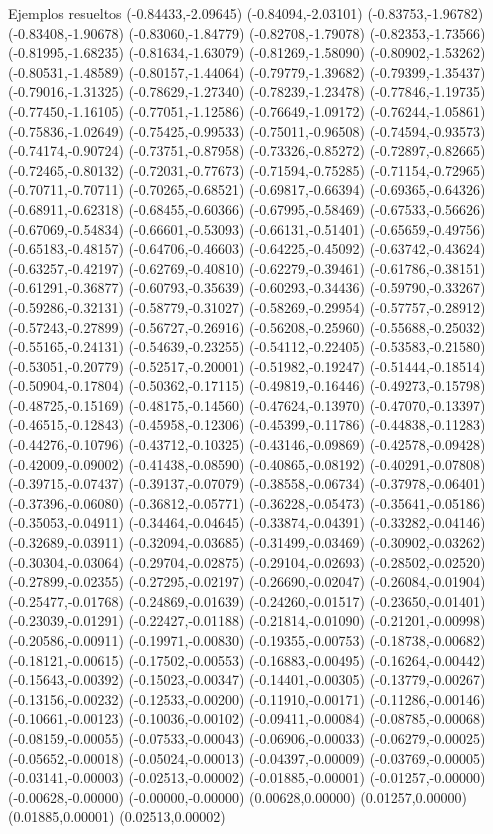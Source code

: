 \documentclass[11pt,a4paper]{article}
\begin{document}
\begin{fmex}{Ejemplos resueltos}
(-0.84433,-2.09645) (-0.84094,-2.03101) (-0.83753,-1.96782) (-0.83408,-1.90678) (-0.83060,-1.84779) (-0.82708,-1.79078) (-0.82353,-1.73566) (-0.81995,-1.68235) (-0.81634,-1.63079) (-0.81269,-1.58090) (-0.80902,-1.53262) (-0.80531,-1.48589) (-0.80157,-1.44064) (-0.79779,-1.39682) (-0.79399,-1.35437) (-0.79016,-1.31325) (-0.78629,-1.27340) (-0.78239,-1.23478) (-0.77846,-1.19735) (-0.77450,-1.16105) (-0.77051,-1.12586) (-0.76649,-1.09172) (-0.76244,-1.05861) (-0.75836,-1.02649) (-0.75425,-0.99533) (-0.75011,-0.96508) (-0.74594,-0.93573) (-0.74174,-0.90724) (-0.73751,-0.87958) (-0.73326,-0.85272) (-0.72897,-0.82665) (-0.72465,-0.80132) (-0.72031,-0.77673) (-0.71594,-0.75285) (-0.71154,-0.72965) (-0.70711,-0.70711) (-0.70265,-0.68521) (-0.69817,-0.66394) (-0.69365,-0.64326) (-0.68911,-0.62318) (-0.68455,-0.60366) (-0.67995,-0.58469) (-0.67533,-0.56626) (-0.67069,-0.54834) (-0.66601,-0.53093) (-0.66131,-0.51401) (-0.65659,-0.49756) (-0.65183,-0.48157) (-0.64706,-0.46603) (-0.64225,-0.45092) (-0.63742,-0.43624) (-0.63257,-0.42197) (-0.62769,-0.40810) (-0.62279,-0.39461) (-0.61786,-0.38151) (-0.61291,-0.36877) (-0.60793,-0.35639) (-0.60293,-0.34436) (-0.59790,-0.33267) (-0.59286,-0.32131) (-0.58779,-0.31027) (-0.58269,-0.29954) (-0.57757,-0.28912) (-0.57243,-0.27899) (-0.56727,-0.26916) (-0.56208,-0.25960) (-0.55688,-0.25032) (-0.55165,-0.24131) (-0.54639,-0.23255) (-0.54112,-0.22405) (-0.53583,-0.21580) (-0.53051,-0.20779) (-0.52517,-0.20001) (-0.51982,-0.19247) (-0.51444,-0.18514) (-0.50904,-0.17804) (-0.50362,-0.17115) (-0.49819,-0.16446) (-0.49273,-0.15798) (-0.48725,-0.15169) (-0.48175,-0.14560) (-0.47624,-0.13970) (-0.47070,-0.13397) (-0.46515,-0.12843) (-0.45958,-0.12306) (-0.45399,-0.11786) (-0.44838,-0.11283) (-0.44276,-0.10796) (-0.43712,-0.10325) (-0.43146,-0.09869) (-0.42578,-0.09428) (-0.42009,-0.09002) (-0.41438,-0.08590) (-0.40865,-0.08192) (-0.40291,-0.07808) (-0.39715,-0.07437) (-0.39137,-0.07079) (-0.38558,-0.06734) (-0.37978,-0.06401) (-0.37396,-0.06080) (-0.36812,-0.05771) (-0.36228,-0.05473) (-0.35641,-0.05186) (-0.35053,-0.04911) (-0.34464,-0.04645) (-0.33874,-0.04391) (-0.33282,-0.04146) (-0.32689,-0.03911) (-0.32094,-0.03685) (-0.31499,-0.03469) (-0.30902,-0.03262) (-0.30304,-0.03064) (-0.29704,-0.02875) (-0.29104,-0.02693) (-0.28502,-0.02520) (-0.27899,-0.02355) (-0.27295,-0.02197) (-0.26690,-0.02047) (-0.26084,-0.01904) (-0.25477,-0.01768) (-0.24869,-0.01639) (-0.24260,-0.01517) (-0.23650,-0.01401) (-0.23039,-0.01291) (-0.22427,-0.01188) (-0.21814,-0.01090) (-0.21201,-0.00998) (-0.20586,-0.00911) (-0.19971,-0.00830) (-0.19355,-0.00753) (-0.18738,-0.00682) (-0.18121,-0.00615) (-0.17502,-0.00553) (-0.16883,-0.00495) (-0.16264,-0.00442) (-0.15643,-0.00392) (-0.15023,-0.00347) (-0.14401,-0.00305) (-0.13779,-0.00267) (-0.13156,-0.00232) (-0.12533,-0.00200) (-0.11910,-0.00171) (-0.11286,-0.00146) (-0.10661,-0.00123) (-0.10036,-0.00102) (-0.09411,-0.00084) (-0.08785,-0.00068) (-0.08159,-0.00055) (-0.07533,-0.00043) (-0.06906,-0.00033) (-0.06279,-0.00025) (-0.05652,-0.00018) (-0.05024,-0.00013) (-0.04397,-0.00009) (-0.03769,-0.00005) (-0.03141,-0.00003) (-0.02513,-0.00002) (-0.01885,-0.00001) (-0.01257,-0.00000) (-0.00628,-0.00000) (-0.00000,-0.00000) (0.00628,0.00000) (0.01257,0.00000) (0.01885,0.00001) (0.02513,0.00002) 
\end{fmex}
\end{document}
